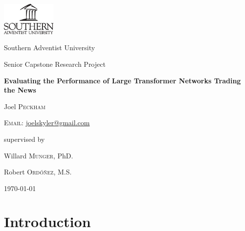 \documentclass[conference]{IEEEtran}
\begin{document}
\begin{titlepage}
    \centering
    \includegraphics[width=0.2\textwidth]{logoBlackV.eps}\par
    \vspace{1.5cm}
    {\LARGE Southern Adventist University \par}
    \vfill
    {\Large Senior Capstone Research Project\par}
    \vspace{1cm}
    {\huge\bfseries Evaluating the Performance of Large Transformer Networks Trading the News\par}
    \vspace{1cm}
    {\large Joel \textsc{Peckham}\par}
    \textsc{Email:} \href{mailto:joelskyler@gmail.com}{joelskyler@gmail.com}\par
    
    \vspace{0.5cm}
    supervised by\par
    Willard \textsc{Munger}, PhD.\par
    Robert \textsc{Ordóñez}, M.S.
    \vfill
    \begin{abstract}
        We explore the viability of using GPT-J, a 6 billion parameter natural language processing model, as a stock market trading indicator. This novel approach leverages both GPT-J's ability to process large, data-rich inputs and GPT-J's deep understanding of the world. We test the performance of both the raw GPT-J-6B weights and our own custom fine-tuned model. Given our data and testing methodology, we found that neither the raw weights nor the fine-tuned model could perform better than random when predicting the direction of movement of a given stock.
    \end{abstract}
    
    \vfill

    {\large \today\par}
\end{titlepage}
\onecolumn
{}
\tableofcontents
\listoffigures
\listoftables
\twocolumn
\thispagestyle{plain}
\pagestyle{plain}
\section{Introduction}
\end{document}
